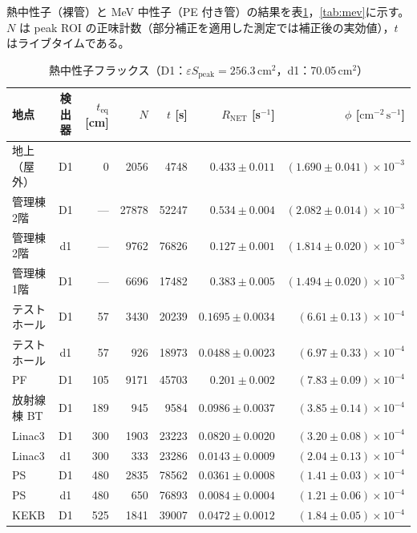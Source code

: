 \documentclass[a4paper,11pt]{ltjsarticle}
\newcommand{\teq}{t_{\mathrm{eq}}}
\newcommand{\RNET}{R_{\mathrm{NET}}}
\newcommand{\eSpk}{\varepsilon S_{\mathrm{peak}}}
\newcommand{\flux}{\mathrm{cm^{-2}\,s^{-1}}}
\begin{document}
熱中性子（裸管）と MeV 中性子（PE 付き管）の結果を表\ref{tab:thermal}，\ref{tab:mev}に示す。
$N$ は peak ROI の正味計数（部分補正を適用した測定では補正後の実効値），$t$ はライブタイムである。

\begin{table}[htbp]
  \centering
  \caption{熱中性子フラックス（D1：$\eSpk=256.3$\,cm$^2$，d1：70.05\,cm$^2$）}
  \label{tab:thermal}
  \small
  \begin{tabular}{lcrrrrr}
    \toprule
    地点 & 検出器 & $\teq$ [cm] & $N$ & $t$ [s] & $\RNET$ [s$^{-1}$] & $\phi$ [$\flux$] \\
    \midrule
    地上（屋外） & D1 & 0   & 2056  & 4748  & $0.433\pm0.011$ & $(1.690\pm0.041)\times10^{-3}$ \\
    管理棟2階   & D1 & --- & 27878 & 52247 & $0.534\pm0.004$ & $(2.082\pm0.014)\times10^{-3}$ \\
    管理棟2階   & d1 & --- & 9762  & 76826 & $0.127\pm0.001$ & $(1.814\pm0.020)\times10^{-3}$ \\
    管理棟1階   & D1 & --- & 6696  & 17482 & $0.383\pm0.005$ & $(1.494\pm0.020)\times10^{-3}$ \\
    テストホール & D1 & 57  & 3430  & 20239 & $0.1695\pm0.0034$ & $(6.61\pm0.13)\times10^{-4}$ \\
    テストホール & d1 & 57  & 926   & 18973 & $0.0488\pm0.0023$ & $(6.97\pm0.33)\times10^{-4}$ \\
    PF          & D1 & 105 & 9171  & 45703 & $0.201\pm0.002$ & $(7.83\pm0.09)\times10^{-4}$ \\
    放射線棟 BT  & D1 & 189 & 945   & 9584  & $0.0986\pm0.0037$ & $(3.85\pm0.14)\times10^{-4}$ \\
    Linac3      & D1 & 300 & 1903  & 23223 & $0.0820\pm0.0020$ & $(3.20\pm0.08)\times10^{-4}$ \\
    Linac3      & d1 & 300 & 333   & 23286 & $0.0143\pm0.0009$ & $(2.04\pm0.13)\times10^{-4}$ \\
    PS          & D1 & 480 & 2835  & 78562 & $0.0361\pm0.0008$ & $(1.41\pm0.03)\times10^{-4}$ \\
    PS          & d1 & 480 & 650   & 76893 & $0.0084\pm0.0004$ & $(1.21\pm0.06)\times10^{-4}$ \\
    KEKB        & D1 & 525 & 1841  & 39007 & $0.0472\pm0.0012$ & $(1.84\pm0.05)\times10^{-4}$ \\
    \bottomrule
  \end{tabular}
\end{table}
\end{document}
